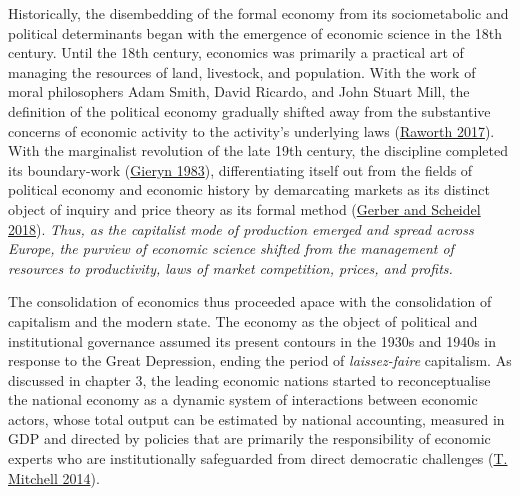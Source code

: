 \documentclass[a4paper, nobind]{templates/ociamthesis}
\begin{document}
Historically, the disembedding of the formal economy from its sociometabolic and political determinants began with the emergence of economic science in the 18th century. Until the 18th century, economics was primarily a practical art of managing the resources of land, livestock, and population. With the work of moral philosophers Adam Smith, David Ricardo, and John Stuart Mill, the definition of the political economy gradually shifted away from the substantive concerns of economic activity to the activity's underlying laws (\protect\hyperlink{ref-raworth_doughnut_2017}{Raworth 2017}). With the marginalist revolution of the late 19th century, the discipline completed its boundary-work (\protect\hyperlink{ref-gieryn_boundary-work_1983}{Gieryn 1983}), differentiating itself out from the fields of political economy and economic history by demarcating markets as its distinct object of inquiry and price theory as its formal method (\protect\hyperlink{ref-gerber_search_2018}{Gerber and Scheidel 2018}). \emph{Thus, as the capitalist mode of production emerged and spread across Europe, the purview of economic science shifted from the management of resources to productivity, laws of market competition, prices, and profits.}

The consolidation of economics thus proceeded apace with the consolidation of capitalism and the modern state. The economy as the object of political and institutional governance assumed its present contours in the 1930s and 1940s in response to the Great Depression, ending the period of \emph{laissez-faire} capitalism. As discussed in chapter 3, the leading economic nations started to reconceptualise the national economy as a dynamic system of interactions between economic actors, whose total output can be estimated by national accounting, measured in GDP and directed by policies that are primarily the responsibility of economic experts who are institutionally safeguarded from direct democratic challenges (\protect\hyperlink{ref-mitchell_economentality_2014}{T. Mitchell 2014}).
\end{document}
